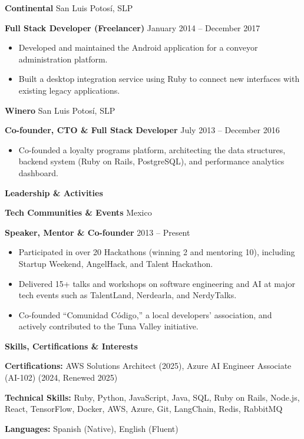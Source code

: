 \documentclass[11pt]{article}
\begin{document}
\vspace{8pt}

\textbf{Continental} \hfill San Luis Potosí, SLP

\textbf{Full Stack Developer (Freelancer)} \hfill January 2014 – December 2017
\begin{itemize}[noitemsep, topsep=0pt, partopsep=0pt, parsep=0pt]
    \item Developed and maintained the Android application for a conveyor administration platform.
    \item Built a desktop integration service using Ruby to connect new interfaces with existing legacy applications.
\end{itemize}

\vspace{8pt}

\textbf{Winero} \hfill San Luis Potosí, SLP

\textbf{Co-founder, CTO \& Full Stack Developer} \hfill July 2013 – December 2016
\begin{itemize}[noitemsep, topsep=0pt, partopsep=0pt, parsep=0pt]
    \item Co-founded a loyalty programs platform, architecting the data structures, backend system (Ruby on Rails, PostgreSQL), and performance analytics dashboard.
\end{itemize}

\vspace{12pt}

\begin{center}
    \textbf{Leadership \& Activities}
\end{center}

\textbf{Tech Communities \& Events}	\hfill Mexico

\textbf{Speaker, Mentor \& Co-founder} \hfill 2013 – Present
\begin{itemize}[noitemsep, topsep=0pt, partopsep=0pt, parsep=0pt]
    \item Participated in over 20 Hackathons (winning 2 and mentoring 10), including Startup Weekend, AngelHack, and Talent Hackathon.
    \item Delivered 15+ talks and workshops on software engineering and AI at major tech events such as TalentLand, Nerdearla, and NerdyTalks.
    \item Co-founded ``Comunidad Código,'' a local developers' association, and actively contributed to the Tuna Valley initiative.
\end{itemize}

\vspace{12pt}

\begin{center}
    \textbf{Skills, Certifications \& Interests}
\end{center}

\textbf{Certifications:} AWS Solutions Architect (2025), Azure AI Engineer Associate (AI-102) (2024, Renewed 2025)

\textbf{Technical Skills:} Ruby, Python, JavaScript, Java, SQL, Ruby on Rails, Node.js, React, TensorFlow, Docker, AWS, Azure, Git, LangChain, Redis, RabbitMQ

\textbf{Languages:} Spanish (Native), English (Fluent)
\end{document}
